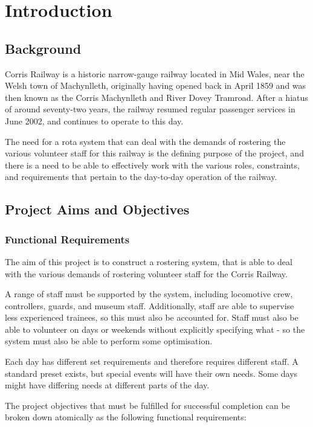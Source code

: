 \chapter{Introduction}

\section{Background}
Corris Railway is a historic narrow-gauge railway located in Mid Wales, near the Welsh town of Machynlleth, originally having opened back in April 1859 and was then known as the Corris Machynlleth and River Dovey Tramroad. \cite{DEVEREAUX01} After a hiatus of around seventy-two years, the railway resumed regular passenger services in June 2002, and continues to operate to this day. \cite{CORRISSOCIETY1}

The need for a rota system that can deal with the demands of rostering the various volunteer staff for this railway is the defining purpose of the project, and there is a need to be able to effectively work with the various roles, constraints, and requirements that pertain to the day-to-day operation of the railway. 

\section{Project Aims and Objectives}
\subsection{Functional Requirements}
The aim of this project is to construct a rostering system, that is able to deal with the various demands of rostering volunteer staff for the Corris Railway. 

A range of staff must be supported by the system, including locomotive crew, controllers, guards, and museum staff. Additionally, staff are able to supervise less experienced trainees, so this must also be accounted for. Staff must also be able to volunteer on days or weekends without explicitly specifying what - so the system must also be able to perform some optimisation.

Each day has different set requirements and therefore requires different staff. A standard preset exists, but special events will have their own needs. Some days might have differing needs at different parts of the day.

The project objectives that must be fulfilled for successful completion can be broken down atomically as the following functional requirements:

